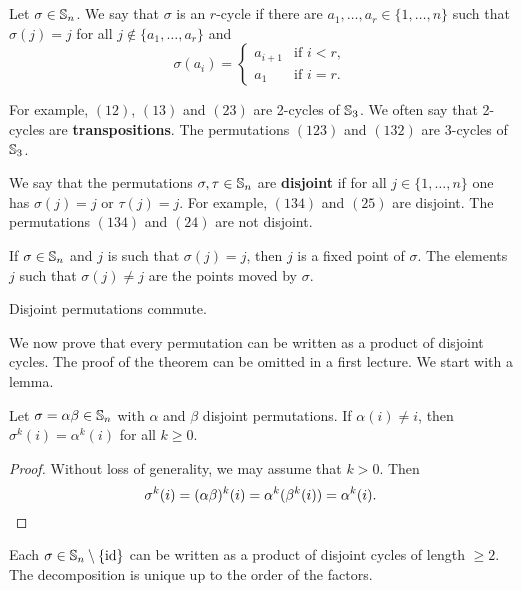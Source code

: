 \chapter{}


Let $\sigma\in\mathbb{S}_n$. We say that $\sigma$ is an $r$-cycle 
if there are $a_1,\dots,a_r\in\{1,\dots,n\}$ such that 
$\sigma(j)=j$ for all $j\not\in\{a_1,\dots,a_r\}$ and 
\[
\sigma(a_i)=\begin{cases}
a_{i+1} & \text{if $i<r$},\\
a_1 & \text{if $i=r$}.
\end{cases}
\]

For example, $(12)$, $(13)$ and $(23)$ are 2-cycles of 
$\mathbb{S}_3$. We often say that 2-cycles are \textbf{transpositions}.
The permutations $(123)$ and $(132)$ are 3-cycles of $\mathbb{S}_3$.

We say that the permutations $\sigma,\tau\in\mathbb{S}_n$ 
are \textbf{disjoint} if for all 
$j\in\{1,\dots,n\}$
one has $\sigma(j)=j$ or $\tau(j)=j$. For example, 
$(134)$ and $(25)$ are disjoint. The permutations $(134)$ and 
$(24)$ are not disjoint. 

If $\sigma\in\mathbb{S}_n$ and $j$ is such that 
$\sigma(j)=j$, then $j$ is a fixed point of $\sigma$. The elements 
$j$ such that 
$\sigma(j)\ne j$ are the points moved by 
$\sigma$.

\begin{claim}
Disjoint permutations commute. 
\end{claim}


We now prove that every permutation can be written 
as a product of disjoint cycles. 
The proof of the theorem can be omitted in a first 
lecture. 
We start with a lemma. 

\begin{lemma}
        Let $\sigma=\alpha\beta\in\mathbb{S}_n$ with $\alpha$ and $\beta$ disjoint permutations. If $\alpha(
i)\ne i$, then $\sigma^k(i)=\alpha^k(i)$ for all $k\geq0$.
\end{lemma}

\begin{proof}
    Without loss of generality, we may assume that $k>0$. Then \[
    \sigma^k(i)=(\alpha\beta)^k(i)=\alpha^k(\beta^k(i))=\alpha^k(i).\qedhere
    \]
\end{proof}

\begin{theorem}
Each $\sigma\in\mathbb{S}_n\setminus\{\operatorname{id}\}$ can be written as a product
of disjoint cycles of length 
 $\geq2$. The decomposition is unique up to 
 the order of the factors. 
 \end{theorem}

